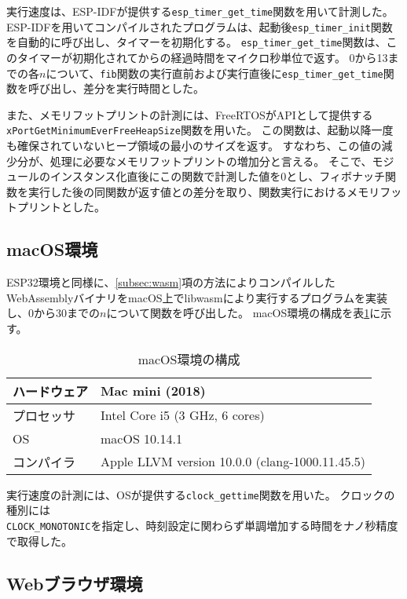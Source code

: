 実行速度は、ESP-IDFが提供する\verb|esp_timer_get_time|関数を用いて計測した。
ESP-IDFを用いてコンパイルされたプログラムは、起動後\verb|esp_timer_init|関数を自動的に呼び出し、タイマーを初期化する。
\verb|esp_timer_get_time|関数は、このタイマーが初期化されてからの経過時間をマイクロ秒単位で返す。
0から13までの各$n$について、\verb|fib|関数の実行直前および実行直後に\verb|esp_timer_get_time|関数を呼び出し、差分を実行時間とした。

また、メモリフットプリントの計測には、FreeRTOSがAPIとして提供する \\
\verb|xPortGetMinimumEverFreeHeapSize|関数を用いた。
この関数は、起動以降一度も確保されていないヒープ領域の最小のサイズを返す。
すなわち、この値の減少分が、処理に必要なメモリフットプリントの増加分と言える。
そこで、モジュールのインスタンス化直後にこの関数で計測した値を0とし、フィボナッチ関数を実行した後の同関数が返す値との差分を取り、関数実行におけるメモリフットプリントとした。

\subsection{macOS環境}

ESP32環境と同様に、\ref{subsec:wasm}項の方法によりコンパイルしたWebAssemblyバイナリをmacOS上でlibwasmにより実行するプログラムを実装し、0から30までの$n$について関数を呼び出した。
macOS環境の構成を表\ref{tab:mac_spec}に示す。

\begin{table}[htbp]
  \label{tab:mac_spec}
  \caption{macOS環境の構成}
  \begin{center}
    \begin{tabular}{|l|l|}
    \hline
    ハードウェア & Mac mini (2018) \\ \hline
    プロセッサ & Intel Core i5 (3 GHz, 6 cores) \\ \hline
    OS & macOS 10.14.1 \\ \hline
    コンパイラ & Apple LLVM version 10.0.0 (clang-1000.11.45.5) \\ \hline
    \end{tabular}
  \end{center}
\end{table}

実行速度の計測には、OSが提供する\verb|clock_gettime|関数を用いた。
クロックの種別には \\
\verb|CLOCK_MONOTONIC|を指定し、時刻設定に関わらず単調増加する時間をナノ秒精度で取得した。

\subsection{Webブラウザ環境}


